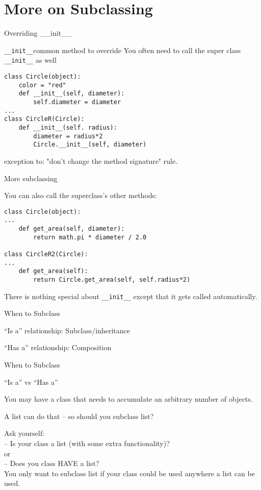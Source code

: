 \documentclass{beamer}
\begin{document}
\section{More on Subclassing}

\begin{frame}[fragile]{Overriding \_\_init\_\_}

{\Large \verb|__init__|common method to override}
\vfill
{\large You often need to call the super class \verb|__init__| as well}
\vfill
\begin{verbatim}
class Circle(object):
    color = "red"
    def __init__(self, diameter):
        self.diameter = diameter
...
class CircleR(Circle):
    def __init__(self. radius):
        diameter = radius*2
        Circle.__init__(self, diameter)
\end{verbatim}
\vfill
exception to: "don't change the method signature" rule.
\end{frame} 

\begin{frame}[fragile]{More subclassing}

{\large You can also call the superclass's other methods:}
\vfill
\begin{verbatim}
class Circle(object):
...
    def get_area(self, diameter):
        return math.pi * diameter / 2.0

class CircleR2(Circle):
...
    def get_area(self):
        return Circle.get_area(self, self.radius*2)
\end{verbatim}

\vfill
There is nothing special about \verb|__init__| except that it gets called automatically.
\end{frame} 


\begin{frame}[fragile]{When to Subclass}

\vfill
{\Large ``Is a'' relationship: Subclass/inheritance}

\vfill
{\Large ``Has a'' relationship: Composition}
\end{frame}

\begin{frame}[fragile]{When to Subclass}

{\Large ``Is a'' vs ``Has a'' }

\vfill
You may have a class that needs to accumulate an arbitrary number of objects.

\vfill
A list can do that -- so should you subclass list?

\vfill
Ask yourself:\\

\vfill
-- Is your class a list (with some extra functionality)?\\
\hspace{0.4in}or\\
-- Does you class HAVE a list?\\

\vfill
You only want to subclass list if your class could be used anywhere a list can be used.
\end{frame}
\end{document}
